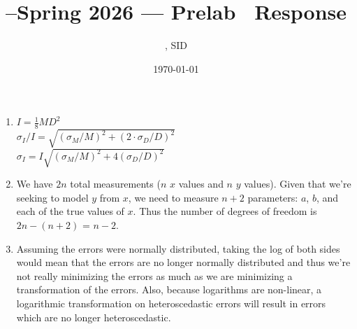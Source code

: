 \documentclass[11pt]{article}
\title{\Cls--Spring 2026 --- Prelab \Prelab \ Response}
\author{\Name, SID \SID}
\date{\today}
\begin{document}
\maketitle

\begin{enumerate}
    \item $I = \frac{1}{8}{M}{D^2}$ \\ $\sigma_I/I = \sqrt{(\sigma_M/M)^2 + (2\cdot \sigma_D/D)^2}$ \\ $\sigma_I = I\sqrt{(\sigma_M/M)^2 + 4(\sigma_D/D)^2}$
    \item We have $2n$ total measurements ($n$ $x$ values and $n$ $y$ values). Given that we're seeking to model $y$ from $x$, we need to measure $n+2$ parameters: $a$, $b$, and each of the true values of $x$. Thus the number of degrees of freedom is $2n - (n+2)$ = $n-2$.
    \item Assuming the errors were normally distributed, taking the log of both sides would mean that the errors are no longer normally distributed and thus we're not really minimizing the errors as much as we are minimizing a transformation of the errors. Also, because logarithms are non-linear, a logarithmic transformation on heteroscedastic errors will result in errors which are no longer heteroscedastic.
\end{enumerate}
\end{document}
